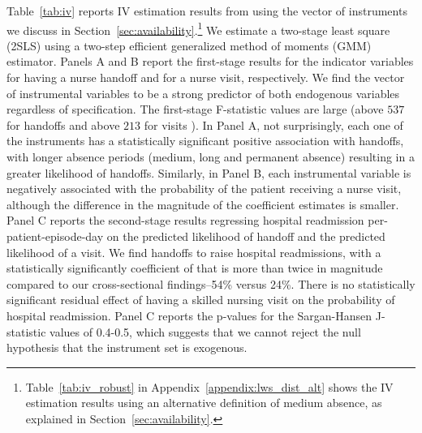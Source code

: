 \documentclass[final,12pt, notitlepage]{article}
\begin{document}
Table~\ref{tab:iv} reports IV estimation results from using the vector of instruments we discuss in Section~\ref{sec:availability}.\footnote{Table~\ref{tab:iv_robust} in Appendix~\ref{appendix:lws_dist_alt} shows the IV estimation results using an alternative definition of medium absence, as explained in Section~\ref{sec:availability}.
}
We estimate a two-stage least square (2SLS) using a two-step efficient generalized method of moments (GMM) estimator. Panels A and B report the first-stage results for the indicator variables for having a nurse handoff and for a nurse visit, respectively.
We find the vector of instrumental variables to be a strong predictor of both endogenous variables regardless of specification.
The first-stage F-statistic values are large (above $537$ for handoffs and above $213$ for visits ).
In Panel A, not surprisingly, each one of the instruments has a statistically significant positive association with handoffs, with longer absence periods (medium, long and permanent absence) resulting in a greater likelihood of handoffs.
Similarly, in Panel B, each instrumental variable is negatively associated with the probability of the patient receiving a nurse visit, although the difference in the magnitude of the coefficient estimates is smaller.
Panel C reports the second-stage results regressing hospital readmission per-patient-episode-day on the predicted likelihood of handoff and the predicted likelihood of a visit.
We find handoffs to raise hospital readmissions, with a statistically significantly coefficient of that is more than twice in magnitude compared to our cross-sectional findings--54\% versus 24\%.
There is no statistically significant residual effect of having a skilled nursing visit on the probability of hospital readmission.
Panel C reports the p-values for the Sargan-Hansen J-statistic values of 0.4-0.5, which suggests that we cannot reject the null hypothesis that the instrument set is exogenous.
%
\end{document}
